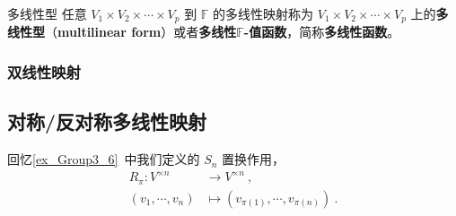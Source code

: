 \begin{definition}{多线性型}\label{def_MulMap_2}
任意 $V_1\times V_2\times\cdots\times V_p$ 到 $\mathbb{F}$ 的多线性映射称为 $V_1\times V_2\times\cdots\times V_p$ 上的\textbf{多线性型}（\textbf{multilinear form}）或者\textbf{多线性$\mathbb{F}$-值函数}，简称\textbf{多线性函数}。
\end{definition}


% 

\subsubsection{双线性映射}


\subsection{对称/反对称多线性映射}


回忆\autoref{ex_Group3_6}~中我们定义的 $S_n$ 置换作用，
\begin{equation}
\begin{aligned}
R_\pi: V^{\times n} &\to V^{\times n}~, \\
(v_1, \cdots, v_n) &\mapsto (v_{\pi(1)}, \cdots, v_{\pi(n)})~.
\end{aligned}
\end{equation}

